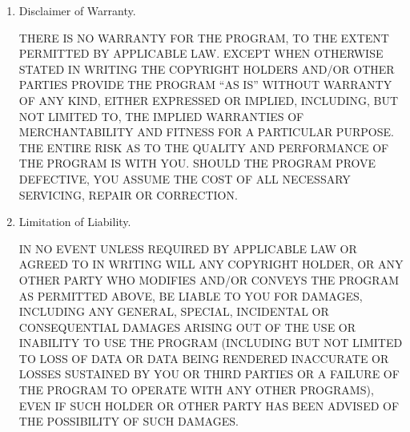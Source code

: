 \documentclass[10pt,a4paper,ngerman,titlepage,tocindentauto]{article}
\begin{document}
\begin{multicols}{3}
{\begin{enumerate}
					The Free Software Foundation may publish revised and/or new versions of
					the GNU Affero General Public License from time to time.  Such new versions will
					be similar in spirit to the present version, but may differ in detail to
					address new problems or concerns.

					Each version is given a distinguishing version number.  If the
					Program specifies that a certain numbered version of the GNU Affero General
					Public License ``or any later version'' applies to it, you have the
					option of following the terms and conditions either of that numbered
					version or of any later version published by the Free Software
					Foundation.  If the Program does not specify a version number of the
					GNU Affero General Public License, you may choose any version ever published
					by the Free Software Foundation.

					If the Program specifies that a proxy can decide which future
					versions of the GNU Affero General Public License can be used, that proxy's
					public statement of acceptance of a version permanently authorizes you
					to choose that version for the Program.

					Later license versions may give you additional or different
					permissions.  However, no additional obligations are imposed on any
					author or copyright holder as a result of your choosing to follow a
					later version.

					\item Disclaimer of Warranty.

					\begin{sloppypar}
					 THERE IS NO WARRANTY FOR THE PROGRAM, TO THE EXTENT PERMITTED BY
					 APPLICABLE LAW.  EXCEPT WHEN OTHERWISE STATED IN WRITING THE
					 COPYRIGHT HOLDERS AND/OR OTHER PARTIES PROVIDE THE PROGRAM ``AS IS''
					 WITHOUT WARRANTY OF ANY KIND, EITHER EXPRESSED OR IMPLIED,
					 INCLUDING, BUT NOT LIMITED TO, THE IMPLIED WARRANTIES OF
					 MERCHANTABILITY AND FITNESS FOR A PARTICULAR PURPOSE.  THE ENTIRE
					 RISK AS TO THE QUALITY AND PERFORMANCE OF THE PROGRAM IS WITH YOU.
					 SHOULD THE PROGRAM PROVE DEFECTIVE, YOU ASSUME THE COST OF ALL
					 NECESSARY SERVICING, REPAIR OR CORRECTION.
					\end{sloppypar}

					\item Limitation of Liability.

					 IN NO EVENT UNLESS REQUIRED BY APPLICABLE LAW OR AGREED TO IN
					 WRITING WILL ANY COPYRIGHT HOLDER, OR ANY OTHER PARTY WHO MODIFIES
					 AND/OR CONVEYS THE PROGRAM AS PERMITTED ABOVE, BE LIABLE TO YOU FOR
					 DAMAGES, INCLUDING ANY GENERAL, SPECIAL, INCIDENTAL OR CONSEQUENTIAL
					 DAMAGES ARISING OUT OF THE USE OR INABILITY TO USE THE PROGRAM
					 (INCLUDING BUT NOT LIMITED TO LOSS OF DATA OR DATA BEING RENDERED
					 INACCURATE OR LOSSES SUSTAINED BY YOU OR THIRD PARTIES OR A FAILURE
					 OF THE PROGRAM TO OPERATE WITH ANY OTHER PROGRAMS), EVEN IF SUCH
					 HOLDER OR OTHER PARTY HAS BEEN ADVISED OF THE POSSIBILITY OF SUCH
					 DAMAGES.


\end{enumerate}}
\end{multicols}
\end{document}
